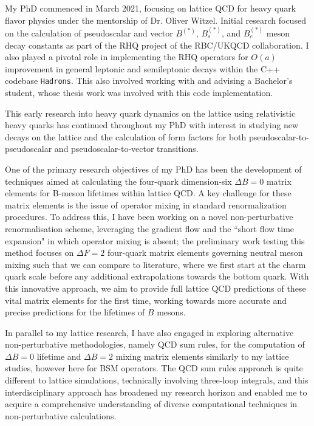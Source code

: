 \documentclass[11pt, a4paper]{awesome-cv}
\begin{document}
\begin{cvletter}
My PhD commenced in March 2021, focusing on lattice QCD for heavy quark flavor physics under the mentorship of Dr. Oliver Witzel. 
Initial research focused on the calculation of pseudoscalar and vector $B^{(*)}$, $B_s^{(*)}$, and $B_c^{(*)}$ meson decay constants as part of the RHQ project of the RBC/UKQCD collaboration. 
I also played a pivotal role in implementing the RHQ operators for $O(a)$ improvement in general leptonic and semileptonic decays within the C++ codebase {\tt Hadrons}. 
This also involved working with and advising a Bachelor's student, whose thesis work was involved with this code implementation.

This early research into heavy quark dynamics on the lattice using relativistic heavy quarks has continued throughout my PhD with interest in studying new decays on the lattice and the calculation of form factors for both pseudoscalar-to-pseudoscalar and pseudoscalar-to-vector transitions.

One of the primary research objectives of my PhD has been the development of techniques aimed at calculating the four-quark dimension-six $\Delta B=0$ matrix elements for B-meson lifetimes within lattice QCD. 
A key challenge for these matrix elements is the issue of operator mixing in standard renormalization procedures. 
To address this, I have been working on a novel non-perturbative renormalisation scheme, leveraging the gradient flow and the ``short flow time expansion" in which operator mixing is absent; the preliminary work testing this method focuses on $\Delta F=2$ four-quark matrix elements governing neutral meson mixing such that we can compare to literature, where we first start at the charm quark scale before any additional extrapolations towards the bottom quark.
With this innovative approach, we aim to provide full lattice QCD predictions of these vital matrix elements for the first time, working towards more accurate and precise predictions for the lifetimes of $B$ mesons.

In parallel to my lattice research, I have also engaged in exploring alternative non-perturbative methodologies, namely QCD sum rules, for the computation of $\Delta B=0$ lifetime and $\Delta B=2$ mixing matrix elements similarly to my lattice studies, however here for BSM operators.
The QCD sum rules approach is quite different to lattice simulations, technically involving three-loop integrals, and this interdisciplinary approach has broadened my research horizon and enabled me to acquire a comprehensive understanding of diverse computational techniques in non-perturbative calculations.


\end{cvletter}
\end{document}
